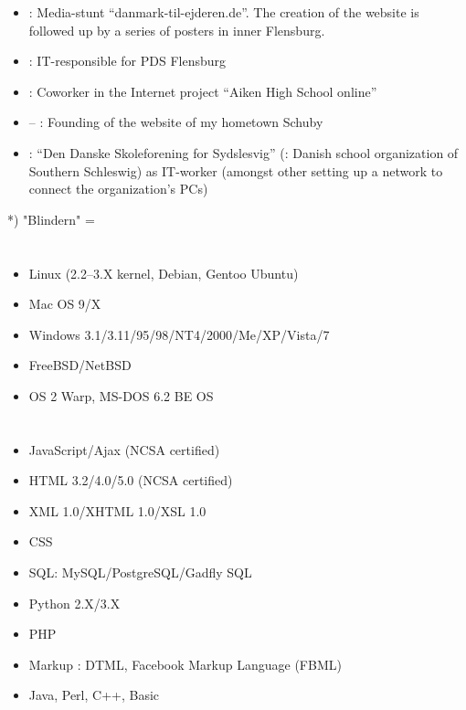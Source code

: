 \begin{itemize}
\item {}: Media-stunt “danmark-til-ejderen.de”. The creation of the website is followed up by a series of posters in inner Flensburg.
\item {}: IT-responsible for PDS Flensburg
\item {}: Coworker in the Internet project “Aiken High School online”
\item {} – : Founding of the website of my hometown Schuby
\item {}: “Den Danske Skoleforening for Sydslesvig” (\english: Danish school organization of Southern Schleswig) as IT-worker (amongst other setting up a network to connect the organization's PCs)


\end{itemize}



*) "Blindern" = \uio


\section*{\ITsystems}

\begin{itemize}
\item Linux (2.2–3.X kernel, Debian, Gentoo \und Ubuntu)
\item Mac OS 9/X
\item Windows 3.1/3.11/95/98/NT4/2000/Me/XP/Vista/7
\item FreeBSD/NetBSD
\item OS 2 Warp, MS-DOS 6.2 \und BE OS
\end{itemize}

\section*{\ITlanguages}

\begin{itemize}
\item JavaScript/Ajax (NCSA certified)
\item HTML 3.2/4.0/5.0 (NCSA certified)
\item XML 1.0/XHTML 1.0/XSL 1.0
\item CSS
\item SQL:  MySQL/PostgreSQL/Gadfly SQL
\item Python 2.X/3.X
\item PHP
\item Markup \languages: DTML, Facebook Markup Language (FBML)
\item \basic Java, Perl, C++, Basic
\end{itemize}

